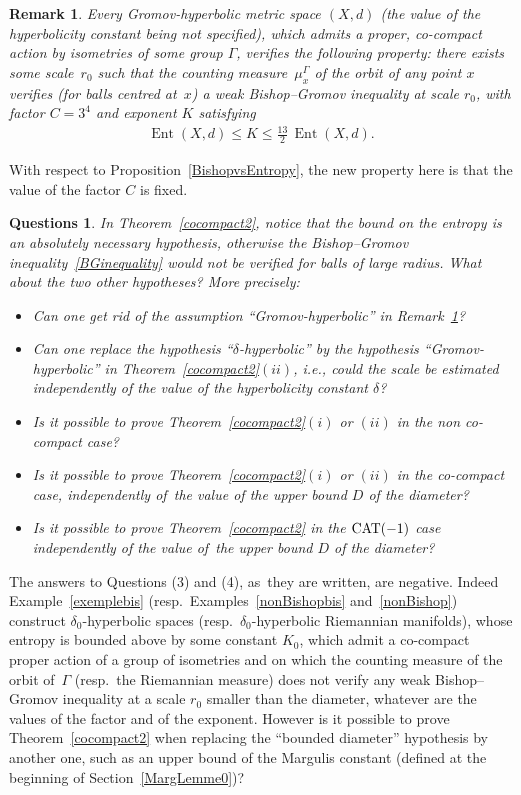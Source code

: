 \documentclass[pdftex]{sigma}
\numberwithin{equation}{section}
\newtheorem{Remark}[theor]{Remark}
\newtheorem{questions}[theor]{Questions}
\newcommand{\Ent}{\operatorname{Ent}}
\begin{document}
\begin{Remark}\label{BGequivEnt}
Every Gromov-hyperbolic metric space $(X,d)$ (the value of the hyperbolicity constant being not specified), which admits a proper, co-compact action by
isometries of some group $\Gamma$, verifies the following property: there
exists some scale~$r_0 $ such that the counting measure~$ \mu^\Gamma_x $ of
the orbit of any point $x$ verifies (for balls centred at~$x$) a weak Bishop--Gromov inequality at scale $r_0$, with factor $C = 3^{4}$ and exponent $K$ satisfying
\begin{gather*}%
\Ent (X,d) \le K \le \frac{13}{2} \, \Ent (X,d).
\end{gather*}
\end{Remark}

With respect to Proposition~\ref{BishopvsEntropy}, the new property here is that the value of the factor $C$ is fixed.

\begin{questions} In Theorem~\ref{cocompact2}, notice that the bound on the entropy is an absolutely necessary hypothesis, otherwise the Bishop--Gromov
inequality~\eqref{BGinequality} would not be verified for balls of large radius. What about the two other hypotheses? More precisely:
\begin{itemize}\itemsep=0pt
\item[(1)]
Can one get rid of the assumption ``Gromov-hyperbolic'' in Remark~\ref{BGequivEnt}?
\item[(2)]
Can one replace the hypothesis ``$\delta$-hyperbolic'' by
the hypothesis ``Gromov-hyperbolic'' in Theorem~\ref{cocompact2}$(ii)$, i.e., could the scale be estimated independently of
the value of the hyperbolicity constant $\delta$?
\item[(3)]
Is it possible to prove Theorem~\ref{cocompact2}$(i)$ or $(ii)$ in the non co-compact case?
\item[(4)]
Is it possible to prove Theorem~\ref{cocompact2}$(i)$ or $(ii)$ in the co-compact case, independently of~the value
of the upper bound $D$ of the diameter?
\item[(5)]
Is it possible to prove Theorem~\ref{cocompact2} in the ${\rm CAT}(-1)$ case independently of the value of~the upper bound $D$ of the diameter?
\end{itemize}
\end{questions}

The answers to Questions (3) and (4), as~they are written, are negative. Indeed Example~\ref{exemplebis} (resp.\ Examples~\ref{nonBishopbis} and~\ref{nonBishop}) construct $\delta_0$-hyperbolic spaces (resp.\ $\delta_0$-hyperbolic Riemannian manifolds), whose entropy is bounded above by some
constant $K_0$, which admit a co-compact proper action of a group of isometries and on which the counting measure of the orbit of~$\Gamma$ (resp.\ the Riemannian measure) does not verify any weak Bishop--Gromov inequality
at a scale $r_0 $ smaller than the diameter, whatever are the values of the factor
and of the exponent.
However is it possible to prove Theorem~\ref{cocompact2} when replacing the ``bounded diameter'' hypothesis by another one, such as an upper bound
of the Margulis constant (defined at the beginning of Section~\ref{MargLemme0})?
\end{document}

